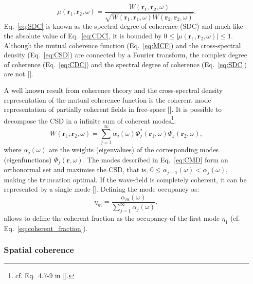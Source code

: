 \begin{refsection}
\begin{equation}
    \mu(\textbf{r}_1,\textbf{r}_2,\omega)=\frac{W(\textbf{r}_1,\textbf{r}_2,\omega)}{\sqrt{W(\textbf{r}_1,\textbf{r}_1,\omega)W(\textbf{r}_2,\textbf{r}_2,\omega)}}.
\end{equation}{}
Eq.~\ref{eq:SDC} is known as the spectral degree of coherence (SDC) and much like the absolute value of Eq.~\ref{eq:CDC}, it is bounded by $0\leq|\mu(\textbf{r}_1,\textbf{r}_2,\omega)|\leq 1$. Although the mutual coherence function (Eq.~\ref{eq:MCF}) and the cross-spectral density (Eq.~\ref{eq:CSD}) are connected by a Fourier transform, the complex degree of coherence (Eq.~\ref{eq:CDC}) and the spectral degree of coherence (Eq.~\ref{eq:SDC}) are not [\cite[\textit{§4.3.2}]{Mandel1995}].

A well known result from coherence theory and the cross-spectral density representation of the mutual coherence function is the coherent mode representation of partially coherent fields in free-space [\cite[\textit{§4.7.1}]{Mandel1995}]. It is possible to decompose the CSD in a infinite sum of coherent modes\footnote{cf. Eq.~4.7-9 in [\cite{Mandel1995}].}:
\begin{equation}\label{eq:CMD}
    W(\textbf{r}_1,\textbf{r}_2,\omega)=\sum\limits_{j=1}^\infty{\alpha_j(\omega)\Phi^*_j(\textbf{r}_1,\omega)\Phi_j(\textbf{r}_2,\omega)},
\end{equation}{}
where $\alpha_j(\omega)$ are the weights (eigenvalues) of the corresponding modes (eigenfunctions) $\Phi_j(\textbf{r},\omega)$. The modes described in Eq.~\ref{eq:CMD}  form an orthonormal set and maximise the CSD, that is, $0\leq \alpha_{j+1}(\omega)<\alpha_j(\omega)$, making the truncation optimal. If the wave-field is completely coherent, it can be represented by a single mode [\cite[\textit{§4.7}]{Mandel1995}]. Defining the mode occupancy as:
\begin{equation}\label{eq:mode_ocupation}
    \eta_m=\frac{\alpha_m(\omega)}{\sum\limits_{j=1}^\infty{\alpha_j(\omega)}},
\end{equation}{}
allows to define the coherent fraction as the occupancy of the first mode $\eta_1$ (cf. Eq.~\ref{eq:coherent_fraction}).

\subsubsection*{Spatial coherence}


\end{refsection}
